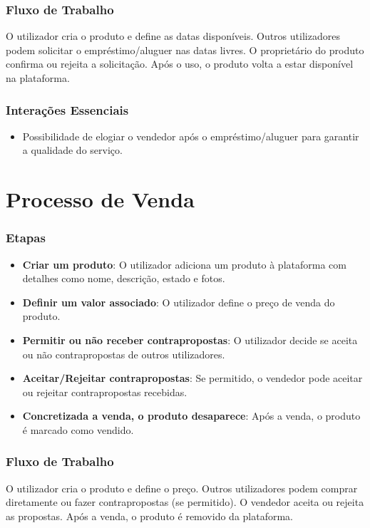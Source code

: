 \documentclass[a4paper, 12pt]{article} %
\begin{document}
\subsubsection{Fluxo de Trabalho}
O utilizador cria o produto e define as datas disponíveis. Outros utilizadores podem solicitar o empréstimo/aluguer nas datas livres. O proprietário do produto confirma ou rejeita a solicitação. Após o uso, o produto volta a estar disponível na plataforma.

\subsubsection{Interações Essenciais}
\begin{itemize}
	\item Possibilidade de elogiar o vendedor após o empréstimo/aluguer para garantir a qualidade do serviço.
\end{itemize}

\section{Processo de Venda}

\subsubsection{Etapas}
\begin{itemize}
	\item \textbf{Criar um produto}: O utilizador adiciona um produto à plataforma com detalhes como nome, descrição, estado e fotos.
	\item \textbf{Definir um valor associado}: O utilizador define o preço de venda do produto.
	\item \textbf{Permitir ou não receber contrapropostas}: O utilizador decide se aceita ou não contrapropostas de outros utilizadores.
	\item \textbf{Aceitar/Rejeitar contrapropostas}: Se permitido, o vendedor pode aceitar ou rejeitar contrapropostas recebidas.
	\item \textbf{Concretizada a venda, o produto desaparece}: Após a venda, o produto é marcado como vendido.
\end{itemize}

\subsubsection{Fluxo de Trabalho}
O utilizador cria o produto e define o preço. Outros utilizadores podem comprar diretamente ou fazer contrapropostas (se permitido). O vendedor aceita ou rejeita as propostas. Após a venda, o produto é removido da plataforma.
\end{document}
